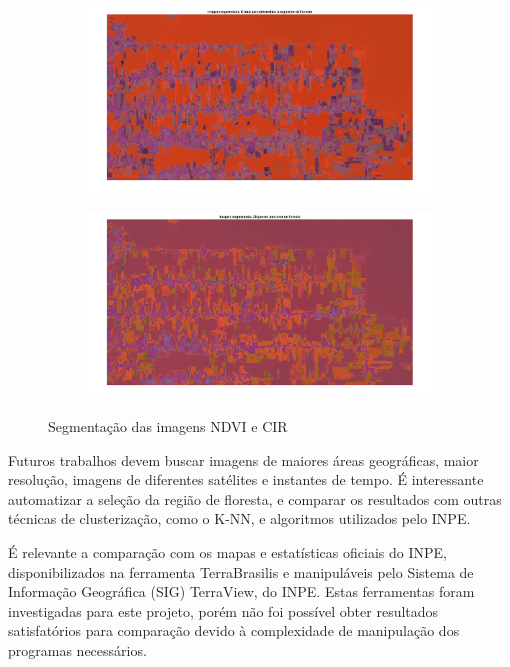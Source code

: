 \documentclass[11pt]{article}
\begin{document}
\begin{figure}[!htb]
	\centering
	\begin{subfigure}[b]{\textwidth}
		\includegraphics[width=\textwidth]{candeias_nov_2022_ndvi_overlay.png}
		\caption{}
		\label{fig:candeias_nov_2022_ndvi_overlay}
	\end{subfigure}
	\begin{subfigure}[b]{\textwidth}
		\includegraphics[width=\textwidth]{candeias_nov_2022_cir_overlay.png}
		\caption{}
		\label{fig:candeias_nov_2022_cir_overlay}
	\end{subfigure}
	
	\caption{Segmentação das imagens  NDVI e  CIR}
	\label{fig:candeias_nov_2022_overlay}
\end{figure}


Futuros trabalhos devem buscar imagens de maiores áreas geográficas, maior resolução, imagens de diferentes satélites e instantes de tempo. É interessante automatizar a seleção da região de floresta, e comparar os resultados com outras técnicas de clusterização, como o K-NN, e algoritmos utilizados pelo INPE.

É relevante a comparação com os mapas e estatísticas oficiais do INPE, disponibilizados na ferramenta TerraBrasilis e manipuláveis pelo Sistema de Informação Geográfica (SIG) TerraView, do INPE. Estas ferramentas foram investigadas para este projeto, porém não foi possível obter resultados satisfatórios para comparação devido à complexidade de manipulação dos programas necessários.




\end{document}
